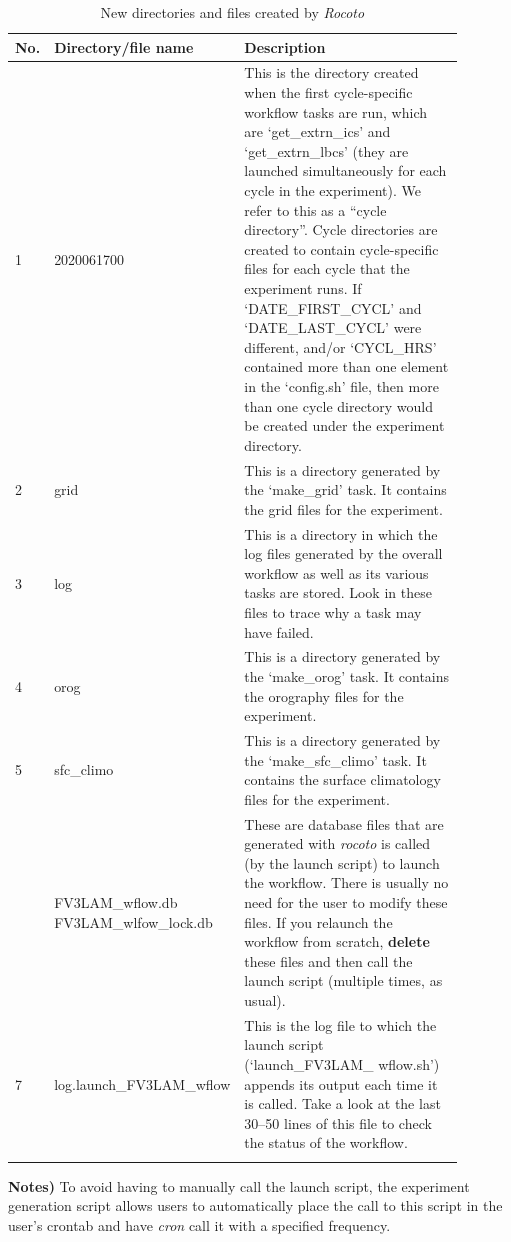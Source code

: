 \documentclass[11pt,fleqn]{report}              %
\begin{document}
{
\fontsize{10}{12}\selectfont
\begin{longtable}{p{0.03\linewidth} | p{0.26\linewidth} | p{0.6\linewidth} }
\hline
\hline
No. & Directory/file name & Description \\
\hline
1 & 2020061700 & This is the directory created when the first cycle-specific workflow tasks are run, which are `get\_extrn\_ics' and `get\_extrn\_lbcs' (they are launched simultaneously for each cycle in the experiment). We refer to this as a ``cycle directory''. Cycle directories are created to contain cycle-specific files for each cycle that the experiment runs. If `DATE\_FIRST\_CYCL' and `DATE\_LAST\_CYCL' were different, and/or `CYCL\_HRS' contained more than one element in the `config.sh' file, then more than one cycle directory would be created under the experiment directory. \\
2 & grid & This is a directory generated by the `make\_grid' task. It contains the grid files for the experiment. \\
3 & log & This is a directory in which the log files generated by the overall workflow as well as its various tasks are stored. Look in these files to trace why a task may have failed. \\
4 & orog & This is a directory generated by the `make\_orog' task. It contains the orography files for the experiment. \\
5 & sfc\_climo & This is a directory generated by the `make\_sfc\_climo' task. It contains the surface climatology files for the experiment. \\
\hdashline
6 & FV3LAM\_wflow.db  FV3LAM\_wlfow\_lock.db & These are database files that are generated with {\it rocoto} is called (by the launch script) to launch the workflow. There is usually no need for the user to modify these files. If you relaunch the workflow from scratch, {\bf delete} these files and then call the launch script (multiple times, as usual). \\
7 & log.launch\_FV3LAM\_wflow & This is the log file to which the launch script (`launch\_FV3LAM\_ wflow.sh') appends its output each time it is called. Take a look at the last 30--50 lines of this file to check the status of the workflow. \\
\hline
\caption{New directories and files created by {\it Rocoto} }
\label{table:wflow_udef_dir}
\end{longtable}
}

{\bf Notes)} To avoid having to manually call the launch script, the experiment generation script allows users to automatically place the call to this script in the user's crontab and have {\it cron} call it with a specified frequency. \\
\end{document}
